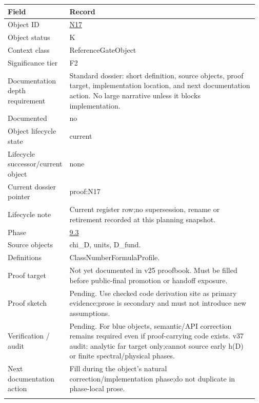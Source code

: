 \begin{longtable}{L{0.16\linewidth} L{0.81\linewidth}}
\hline
\textbf{Field} & \textbf{Record}\\
\hline
Object ID & \hyperlink{object-row-N17}{N17}\\
\hline\addlinespace[0.20em]
Object status & K\\
\hline\addlinespace[0.20em]
Context class & ReferenceGateObject\\
\hline\addlinespace[0.20em]
Significance tier & F2\\
\hline\addlinespace[0.20em]
Documentation depth requirement & Standard dossier: short definition, source objects, proof target, implementation location, and next documentation action. No large narrative unless it blocks implementation.\\
\hline\addlinespace[0.20em]
Documented & no\\
\hline\addlinespace[0.20em]
Object lifecycle state & current\\
\hline\addlinespace[0.20em]
Lifecycle successor/\allowbreak{}current object & none\\
\hline\addlinespace[0.20em]
Current dossier pointer & proof:N17\\
\hline\addlinespace[0.20em]
Lifecycle note & Current register row;\newline no supersession, rename or retirement recorded at this planning snapshot.\\
\hline\addlinespace[0.20em]
Phase & \hyperlink{phase-row-9-3}{9.3}\\
\hline\addlinespace[0.20em]
Source objects & chi\_D, units, D\_fund.\\
\hline\addlinespace[0.20em]
Definitions & ClassNumberFormulaProfile.\\
\hline\addlinespace[0.20em]
Proof target & Not yet documented in v25 proofbook. Must be filled before public-final promotion or handoff exposure.\\
\hline\addlinespace[0.20em]
Proof sketch & Pending. Use checked code derivation site as primary evidence;\newline prose is secondary and must not introduce new assumptions.\\
\hline\addlinespace[0.20em]
Verification /\allowbreak{} audit & Pending. For blue objects, semantic/\allowbreak{}API correction remains required even if proof-carrying code exists. v37 audit: analytic far target only;\newline cannot source early h(D) or finite spectral/\allowbreak{}physical phases.\\
\hline\addlinespace[0.20em]
Next documentation action & Fill during the object's natural correction/\allowbreak{}implementation phase;\newline do not duplicate in phase-local prose.\\
\hline\addlinespace[0.20em]
\end{longtable}
